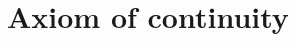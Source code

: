 \documentclass[preview]{standalone}
\begin{document}
\genpage

\section{Axiom of continuity}

%
%
%
%
\end{document}
